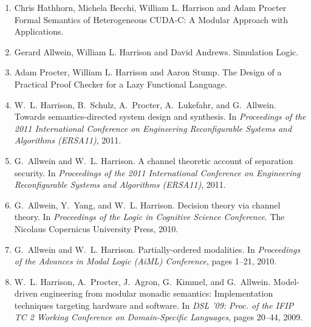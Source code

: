 \documentclass[12pt]{article} %
\begin{document}
\begin{enumerate}[leftmargin=0.0mm]
\item
Chris Hathhorn, Michela Becchi, William L. Harrison and Adam Procter
\newblock Formal Semantics of Heterogeneous CUDA-C: A Modular Approach with Applications.

\item
Gerard Allwein, William L. Harrison and David Andrews.
\newblock Simulation Logic.


\item
 Adam Procter, William L. Harrison and Aaron Stump.
 \newblock The Design of a Practical Proof Checker for a Lazy Functional Language.


\item
W.~L. Harrison, B.~Schulz, A.~Procter, A.~Lukefahr, and G.~Allwein.
\newblock Towards semantics-directed system design and synthesis.
\newblock In {\em Proceedings of the 2011 International Conference on
  Engineering Reconfigurable Systems and Algorithms (ERSA11)}, 2011.

\item
G.~Allwein and W.~L. Harrison.
\newblock A channel theoretic account of separation security.
\newblock In {\em Proceedings of the 2011 International Conference on
  Engineering Reconfigurable Systems and Algorithms (ERSA11)}, 2011.



\item
G.~Allwein, Y.~Yang, and W.~L. Harrison.
\newblock Decision theory via channel theory.
\newblock In {\em Proceedings of the Logic in Cognitive Science Conference}. The Nicolaus Copernicus
  University Press, 2010.

\item
G.~Allwein and W.~L. Harrison.
\newblock Partially-ordered modalities.
\newblock In {\em Proceedings of the Advances in Modal Logic (AiML) Conference}, pages 1--21, 2010.

\item
W.~L. Harrison, A.~Procter, J.~Agron, G.~Kimmel, and G.~Allwein.
\newblock Model-driven engineering from modular monadic semantics:
  Implementation techniques targeting hardware and software.
\newblock In {\em DSL '09: Proc. of the IFIP TC 2 Working Conference on
  Domain-Specific Languages}, pages 20--44, 2009.




\end{enumerate}
\end{document}
